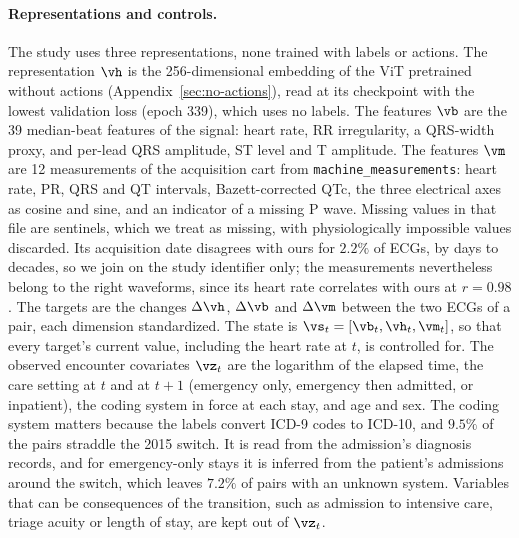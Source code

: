 \paragraph{Representations and controls.} The study uses three representations, none trained with labels or actions. The representation $\vh$ is the 256-dimensional embedding of the ViT pretrained without actions (Appendix~\ref{sec:no-actions}), read at its checkpoint with the lowest validation loss (epoch 339), which uses no labels. The features $\vb$ are the 39 median-beat features of the signal: heart rate, RR irregularity, a QRS-width proxy, and per-lead QRS amplitude, ST level and T amplitude. The features $\vm$ are 12 measurements of the acquisition cart from \texttt{machine\_measurements}: heart rate, PR, QRS and QT intervals, Bazett-corrected QTc, the three electrical axes as cosine and sine, and an indicator of a missing P wave. Missing values in that file are sentinels, which we treat as missing, with physiologically impossible values discarded. Its acquisition date disagrees with ours for $2.2\%$ of ECGs, by days to decades, so we join on the study identifier only; the measurements nevertheless belong to the right waveforms, since its heart rate correlates with ours at $r=0.98$. The targets are the changes $\Delta\vh$, $\Delta\vb$ and $\Delta\vm$ between the two ECGs of a pair, each dimension standardized. The state is $\vs_t=[\vb_t,\vh_t,\vm_t]$, so that every target's current value, including the heart rate at $t$, is controlled for. The observed encounter covariates $\vz_t$ are the logarithm of the elapsed time, the care setting at $t$ and at $t+1$ (emergency only, emergency then admitted, or inpatient), the coding system in force at each stay, and age and sex. The coding system matters because the labels convert ICD-9 codes to ICD-10, and $9.5\%$ of the pairs straddle the 2015 switch. It is read from the admission's diagnosis records, and for emergency-only stays it is inferred from the patient's admissions around the switch, which leaves $7.2\%$ of pairs with an unknown system. Variables that can be consequences of the transition, such as admission to intensive care, triage acuity or length of stay, are kept out of $\vz_t$.

